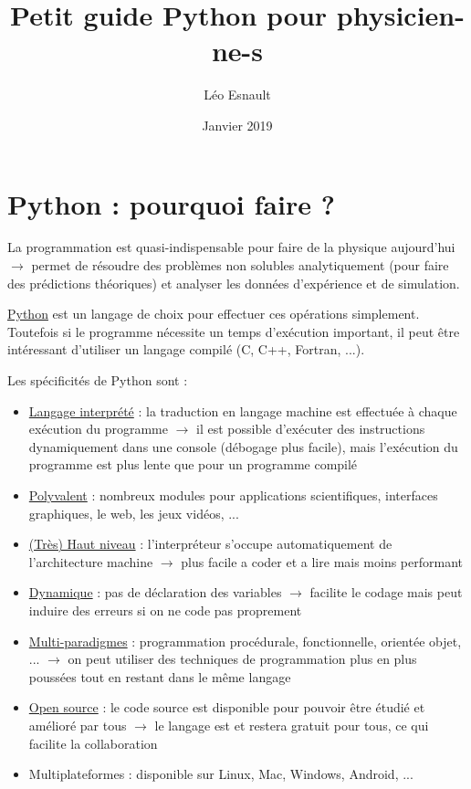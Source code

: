 \documentclass{article}
\title{Petit guide Python pour physicien-ne-s}
\author{Léo Esnault}
\date{Janvier 2019}
\begin{document}
\maketitle

\section{Python : pourquoi faire ?}
La programmation est quasi-indispensable pour faire de la physique aujourd'hui $\to$ permet de résoudre des problèmes non solubles analytiquement (pour faire des prédictions théoriques) et analyser les données d'expérience et de simulation.

\href{https://fr.wikipedia.org/wiki/Python_(langage)}{Python} est un langage de choix pour effectuer ces opérations simplement. Toutefois si le programme nécessite un temps d'exécution important, il peut être intéressant d'utiliser un langage compilé (C, C++, Fortran, ...).

Les spécificités de Python sont :
\begin{itemize}
    \item \href{https://fr.wikipedia.org/wiki/Interpr\%C3\%A8te_(informatique)}{Langage interprété} :
    la traduction en langage machine est effectuée à chaque exécution du programme $\to$ il est possible d'exécuter des instructions dynamiquement dans une console (débogage plus facile), mais l'exécution du programme est plus lente que pour un programme compilé
    \item \href{https://en.wikipedia.org/wiki/List_of_Python_software}{Polyvalent} :
    nombreux modules pour applications scientifiques, interfaces graphiques, le web, les jeux vidéos, ...
    \item \href{https://fr.wikipedia.org/wiki/Langage_de_haut_niveau}{(Très) Haut niveau} :
    l'interpréteur s'occupe automatiquement de l'architecture machine $\to$ plus facile a coder et a lire mais moins performant
    \item \href{https://fr.wikipedia.org/wiki/Langage_de_programmation_dynamique}{Dynamique} :
    pas de déclaration des variables $\to$ facilite le codage mais peut induire des erreurs si on ne code pas proprement
    \item \href{https://fr.wikipedia.org/wiki/Paradigme_(programmation)}{Multi-paradigmes} : programmation procédurale, fonctionnelle, orientée objet, ... $\to$ on peut utiliser des techniques de programmation plus en plus poussées tout en restant dans le même langage
    \item \href{https://fr.wikipedia.org/wiki/Licence_libre}{Open source} :
    le code source est disponible pour pouvoir être étudié et amélioré par tous $\to$ le langage est et restera gratuit pour tous, ce qui facilite la collaboration
    \item Multiplateformes : disponible sur Linux, Mac, Windows, Android, ...
\end{itemize}
\end{document}
